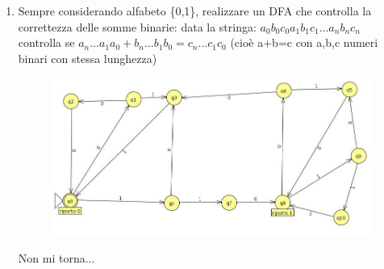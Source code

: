 \documentclass[12pt]{article}
\begin{document}
\begin{enumerate}
\item Sempre considerando alfabeto \{0,1\}, realizzare un DFA che controlla la correttezza delle somme binarie: data la stringa: $a_0 b_0 c_0 a_1 b_1 c_1 ... a_n b_n c_n$ controlla se $a_n...a_1 a_0 + b_n...b_1 b_0 = c_n...c_1 c_0$ (cioè a+b=c con a,b,c numeri binari con stessa lunghezza) 

\begin{figure}[h]
  \includegraphics[scale = 0.4]{media/09_21_es7.jpg}
  \centering
\end{figure}

Non mi torna...

\end{enumerate}

\newpage
\end{document}
